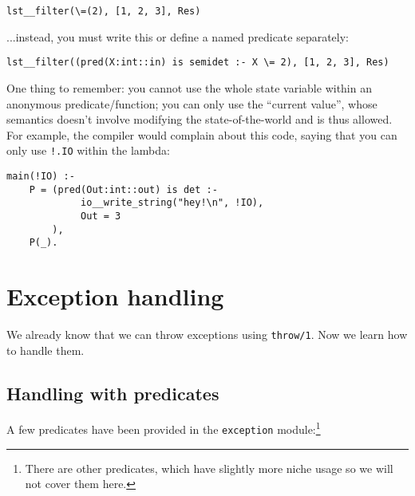 \begin{lstlisting}[language=Mercury]
% ...
lst__filter(\=(2), [1, 2, 3], Res)
\end{lstlisting}

...instead, you must write this or define a named predicate separately:

\begin{lstlisting}[language=Mercury]
% ...
lst__filter((pred(X:int::in) is semidet :- X \= 2), [1, 2, 3], Res)
\end{lstlisting}

One thing to remember: you cannot use the whole state variable within an anonymous predicate/function; you can only use the ``current value'', whose semantics doesn't involve modifying the state-of-the-world and is thus allowed. For example, the compiler would complain about this code, saying that you can only use \texttt{!.IO} within the lambda:

\begin{lstlisting}[language=Mercury]
main(!IO) :-
	P = (pred(Out:int::out) is det :-
			 io__write_string("hey!\n", !IO),
			 Out = 3
		),
	P(_).
\end{lstlisting}


\section{Exception handling}

We already know that we can throw exceptions using \texttt{throw/1}. Now we learn how to handle them.

\subsection{Handling with predicates}

A few predicates have been provided in the \texttt{exception} module:\footnote{There are other predicates, which have slightly more niche usage so we will not cover them here.}

